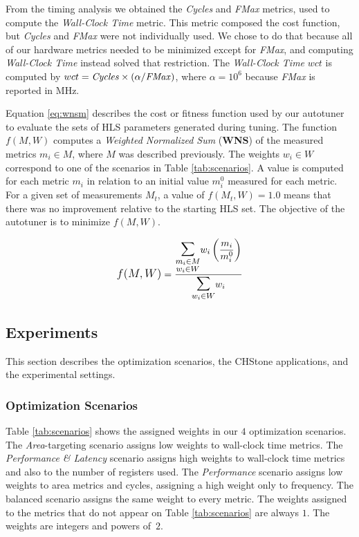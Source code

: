From the timing analysis we obtained the \textit{Cycles} and \textit{FMax}
metrics, used to compute the \textit{Wall-Clock Time} metric. This metric
composed the cost function, but \textit{Cycles} and \textit{FMax} were not
individually used. We chose to do that because all of our hardware metrics
needed to be minimized except for \textit{FMax}, and computing
\textit{Wall-Clock Time} instead solved that restriction.  The
\textit{Wall-Clock Time} $wct$ is computed by $wct = \text{\textit{Cycles}}
\times (\alpha / \text{\textit{FMax}})$, where $\alpha = 10^6$ because
\textit{FMax} is reported in MHz.

Equation \ref{eq:wnsm} describes the cost or fitness function used by our
autotuner to evaluate the sets of HLS parameters generated during tuning.  The
function $f(M, W)$ computes a \textit{Weighted Normalized Sum} (\textbf{WNS})
of the measured metrics $m_i \in M$, where $M$ was described previously.  The
weights $w_i \in W$ correspond to one of the scenarios in Table
\ref{tab:scenarios}. A value is computed for each metric $m_i$ in relation to
an initial value $m_{i}^{0}$ measured for each metric.  For a given set of
measurements $M_t$, a value of $f(M_t, W) = 1.0$ means that there was no
improvement relative to the starting HLS set. The objective of the autotuner is
to minimize $f(M, W)$.

\begin{align} \label{eq:wnsm}
    \mathlarger{f(M, W)} = \frac{\mathlarger{\mathlarger{\mathlarger{\sum}}}\limits_{\substack{m_i \in M \\ w_i \in W}}{w_i\left(\dfrac{m_i}{m_{i}^{0}}\right)}}{\mathlarger{\mathlarger{\mathlarger{\sum}}}\limits_{w_i \in W}{w_i}}
\end{align}

\subsection{Experiments}
\label{sec:FPGAexp}

This section describes the optimization scenarios, the CHStone applications,
and the experimental settings.

\subsubsection{Optimization Scenarios}

Table \ref{tab:scenarios} shows the assigned weights in our $4$ optimization
scenarios. The \textit{Area}-targeting scenario assigns low weights to
wall-clock time metrics. The \textit{Performance \& Latency} scenario assigns
high weights to wall-clock time metrics and also to the number of registers
used.  The \textit{Performance} scenario assigns low weights to area metrics
and cycles, assigning a high weight only to frequency. The balanced scenario
assigns the same weight to every metric. The weights assigned to the metrics
that do not appear on Table \ref{tab:scenarios} are always $1$. The weights are
integers and powers of~$2$.

